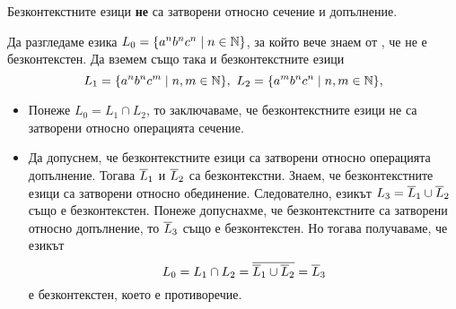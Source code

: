 \begin{framed}
  \begin{proposition}
    Безконтекстните езици {\bf не} са затворени относно сечение и допълнение.
  \end{proposition}
\end{framed}
\begin{hint}
  Да разгледаме езика $L_0 = \{a^nb^nc^n\mid n\in\mathbb{N}\}$, за който вече знаем от , че не е безконтекстен.
  Да вземем също така и безконтекстните езици 
  \[L_1 = \{a^nb^nc^m\mid n,m\in\mathbb{N}\},\ L_2 = \{a^mb^nc^n\mid n,m\in\mathbb{N}\},\]
  \begin{itemize}
  \item 
    Понеже $L_0 = L_1\cap L_2$, то заключаваме, че безконтекстните езици не са затворени 
    относно операцията сечение.
  \item
    Да допуснем, че безконтекстните езици са затворени относно операцията допълнение.
    Тогава  $\overline{L}_1$ и $\overline{L}_2$ са безконтекстни.
    Знаем, че безконтекстните езици са затворени относно обединение. 
    Следователно, езикът $L_3 = \overline{L}_1 \cup \overline{L}_2$ също е безконтекстен.
    Понеже допуснахме, че безконтекстните са затворени относно допълнение, то $\overline{L}_3$ също е безконтекстен.
    Но тогава получаваме, че езикът
    \[L_0 = L_1 \cap L_2 = \overline{\overline{L}_1 \cup \overline{L}_2} = \overline{L}_3\]
    е безконтекстен, което е противоречие.
  \end{itemize}
\end{hint}



